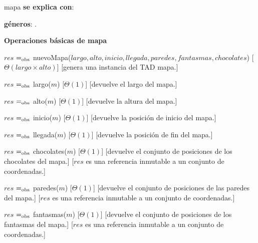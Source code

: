 \documentclass[10pt,a4paper]{article}
\begin{document}
\begin{Interfaz}
  
    mapa \textbf{se explica con}: 
  
    \textbf{géneros}: .
  
    \textbf{Operaciones básicas de mapa}
  
    {$res$ $=_{\mathrm{obs}}$ nuevoMapa($largo, alto, inicio, llegada, paredes, fantasmas, chocolates$)}%
    [$\Theta(largo \times alto)$]%
    [genera una instancia del TAD mapa.]%
  
    {$res$ $=_{\mathrm{obs}}$ largo($m$)}%
    [$\Theta(1)$]
    [devuelve el largo del mapa.]%

    {$res$ $=_{\mathrm{obs}}$ alto($m$)}%
    [$\Theta(1)$]
    [devuelve la altura del mapa.]%

    {$res$ $=_{\mathrm{obs}}$ inicio($m$)}%
    [$\Theta(1)$]
    [devuelve la posición de inicio del mapa.]%

    {$res$ $=_{\mathrm{obs}}$ llegada($m$)}%
    [$\Theta(1)$]
    [devuelve la posición de fin del mapa.]%
  
    {$res$ $=_{\mathrm{obs}}$ chocolates($m$)}%
    [$\Theta(1)$]
    [devuelve el conjunto de posiciones de los chocolates del mapa.]%
    [$res$ es una referencia inmutable a un conjunto de coordenadas.]
    
    {$res$ $=_{\mathrm{obs}}$ paredes($m$)}%
    [$\Theta(1)$]
    [devuelve el conjunto de posiciones de las paredes del mapa.]%
    [$res$ es una referencia inmutable a un conjunto de coordenadas.]
    
    {$res$ $=_{\mathrm{obs}}$ fantasmas($m$)}%
    [$\Theta(1)$]
    [devuelve el conjunto de posiciones de los fantasmas del mapa.]%
    [$res$ es una referencia inmutable a un conjunto de coordenadas.]
    
  \end{Interfaz}
\end{document}
